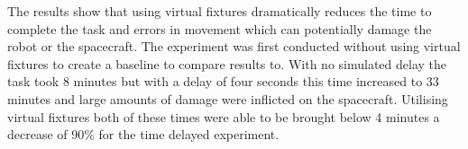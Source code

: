 \documentclass[13pt]{article}
\begin{document}
The results show that using virtual fixtures dramatically reduces the time to complete the task and errors in movement which can potentially damage the robot or the spacecraft. The experiment was first conducted without using virtual fixtures to create a baseline to compare results to. With no simulated delay the task took 8 minutes but with a delay of four seconds this time increased to 33 minutes and large amounts of damage were inflicted on the spacecraft. Utilising virtual fixtures both of these times were able to be brought below 4 minutes a decrease of 90\% for the time delayed experiment.


\end{document}
